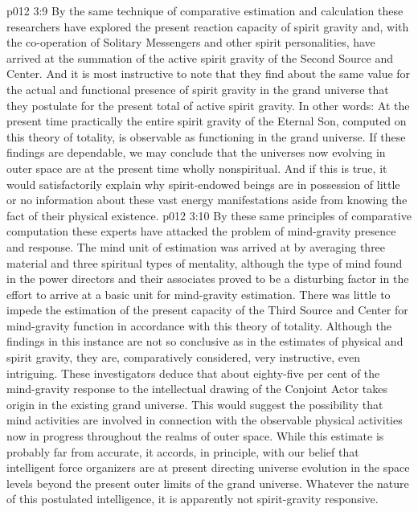 \vs p012 3:9 \pc {}\bibnobreakspace {} By the same technique of comparative estimation and calculation these researchers have explored the present reaction capacity of spirit gravity and, with the co\hyp{}operation of Solitary Messengers and other spirit personalities, have arrived at the summation of the active spirit gravity of the Second Source and Center. And it is most instructive to note that they find about the same value for the actual and functional presence of spirit gravity in the grand universe that they postulate for the present total of active spirit gravity. In other words: At the present time practically the entire spirit gravity of the Eternal Son, computed on this theory of totality, is observable as functioning in the grand universe. If these findings are dependable, we may conclude that the universes now evolving in outer space are at the present time wholly nonspiritual. And if this is true, it would satisfactorily explain why spirit\hyp{}endowed beings are in possession of little or no information about these vast energy manifestations aside from knowing the fact of their physical existence.
\vs p012 3:10 \pc {}\bibnobreakspace {} By these same principles of comparative computation these experts have attacked the problem of mind\hyp{}gravity presence and response. The mind unit of estimation was arrived at by averaging three material and three spiritual types of mentality, although the type of mind found in the power directors and their associates proved to be a disturbing factor in the effort to arrive at a basic unit for mind\hyp{}gravity estimation. There was little to impede the estimation of the present capacity of the Third Source and Center for mind\hyp{}gravity function in accordance with this theory of totality. Although the findings in this instance are not so conclusive as in the estimates of physical and spirit gravity, they are, comparatively considered, very instructive, even intriguing. These investigators deduce that about eighty\hyp{}five per cent of the mind\hyp{}gravity response to the intellectual drawing of the Conjoint Actor takes origin in the existing grand universe. This would suggest the possibility that mind activities are involved in connection with the observable physical activities now in progress throughout the realms of outer space. While this estimate is probably far from accurate, it accords, in principle, with our belief that intelligent force organizers are at present directing universe evolution in the space levels beyond the present outer limits of the grand universe. Whatever the nature of this postulated intelligence, it is apparently not spirit\hyp{}gravity responsive.
